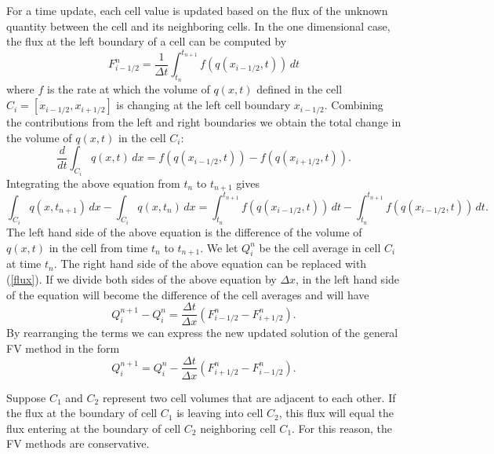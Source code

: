 For a time update, each cell value is updated based on the flux of the unknown quantity between the cell and its neighboring cells. In the one dimensional case, the flux at the left boundary of a cell can be computed by
%
\begin{equation}
\label{flux}
F_{i-1/2}^n = \frac{1}{\Delta t} \int_{t_n}^{t_{n+1}} f(q(x_{i-1/2},t)) \, dt
\end{equation}
%
where $f$ is the rate at which the volume of $q(x,t)$ defined in the cell $C_{i}=[x_{i-1/2},x_{i+1/2}]$ is changing at the left cell boundary $x_{i-1/2}$. Combining the contributions from the left and right boundaries we obtain the total change in the volume of $q(x,t)$ in the cell $C_{i}$:
%
\begin{equation}
\label{f}
\frac{d}{dt} \int_{C_i} q(x,t) \, dx = f(q(x_{i-1/2},t)) - f(q(x_{i+1/2},t)).
\end{equation}
%
Integrating the above equation from $t_n$ to $t_{n+1}$ gives
%
\begin{equation*}
\int_{C_i} q(x,t_{n+1}) \, dx - \int_{C_i} q(x,t_n) \, dx = \int_{t_n}^{t_{n+1}} f(q(x_{i-1/2},t)) \, dt - \int_{t_n}^{t_{n+1}} f(q(x_{i-1/2},t)) \, dt.
\end{equation*}
%
The left hand side of the above equation is the difference of the volume of $q(x,t)$ in the cell from time $t_n$ to $t_{n+1}$. We let $Q_i^n$ be the cell average in cell $C_i$ at time $t_n$. The right hand side of the above equation can be replaced with (\ref{flux}). If we divide both sides of the above equation by $\Delta x$, in the left hand side of the equation will become the difference of the cell averages and will have
%
\begin{equation*}
Q_i^{n+1} - Q_i^n = \frac{\Delta t}{\Delta x} \left( F_{i-1/2}^n - F_{i+1/2}^n \right).
\end{equation*}
%
By rearranging the terms we can express the new updated solution of the general FV method in the form
%
\begin{equation}
\label{FVmethod}
Q_i^{n+1} = Q_i^n - \frac{\Delta t}{\Delta x} \left( F_{i+1/2}^n - F_{i-1/2}^n \right).
\end{equation}
%

Suppose $C_1$ and $C_2$ represent two cell volumes that are adjacent to each other. If the flux at the boundary of cell $C_1$ is leaving into cell $C_2$, this flux will equal the flux entering at the boundary of cell $C_2$ neighboring cell $C_1$. For this reason, the FV methods are conservative.
